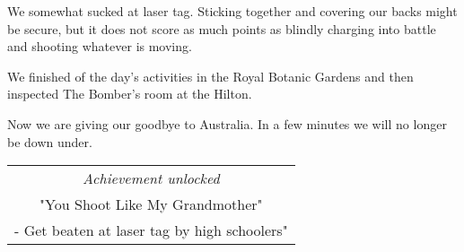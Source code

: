 We somewhat sucked at laser tag.
Sticking together and covering our backs might be secure, but it does not score as much points as blindly charging into battle and shooting whatever is moving.

We finished of the day's activities in the Royal Botanic Gardens and then inspected The Bomber's room at the Hilton.

Now we are giving our goodbye to Australia.
In a few minutes we will no longer be down under.

\begin{center}
\begin{tabular}{||c||}
\emph{Achievement unlocked}\\
"You Shoot Like My Grandmother"\\
\multicolumn{1}{||p{0.8\textwidth}||}{\footnotesize - Get beaten at laser tag by high schoolers"} \\
\end{tabular}
\end{center}
